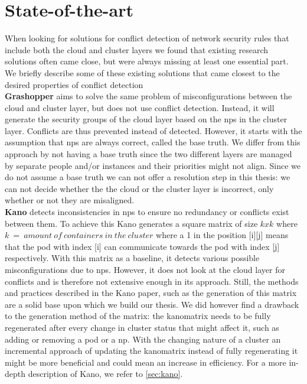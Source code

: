 \section{State-of-the-art} \label{sec:stateoftheart}
When looking for solutions for conflict detection of network security rules that include both the cloud and cluster layers we found that existing research solutions often came close, but were always missing at least one essential part. We briefly describe some of these existing solutions that came closest to the desired properties of conflict detection
\\[10pt]

\textbf{Grashopper} \cite{grashopper}  aims to solve the same problem of misconfigurations between the cloud and cluster layer, but does not use conflict detection. Instead, it will generate the security groups of the cloud layer based on the \acrshort{np}s in the cluster layer. Conflicts are thus prevented instead of detected. However, it starts with the assumption that \acrshort{np}s are always correct, called the base truth. We differ from this approach by not having a base truth since the two different layers are managed by separate people and/or instances and their priorities might not align. Since we do not assume a base truth we can not offer a resolution step in this thesis: we can not decide whether the the cloud or the cluster layer is incorrect, only whether or not they are misaligned.
\\[10pt]

\textbf{Kano} \cite{kano} detects inconsistencies in \acrshort{np}s to ensure no redundancy or conflicts exist between them. 
To achieve this Kano generates a square matrix of size \(kxk\) where \(k\ =\ amount\  of\  containers\  in\  the\  cluster\) where a 1 in the position [i][j] means that the pod with index [i] can communicate towards the pod with index [j] respectively. With this matrix as a baseline, it detects various possible misconfigurations due to \acrshort{np}s. However, it does not look at the cloud layer for conflicts and is therefore not extensive enough in its approach. Still, the methods and practices described in the Kano paper, such as the generation of this matrix are a solid base upon which we build our thesis. We did however find a drawback to the generation method of the matrix: the kanomatrix needs to be fully regenerated after every change in cluster status that might affect it, such as adding or removing a pod or a \acrshort{np}. With the changing nature of a cluster an incremental approach of updating the kanomatrix instead of fully regenerating it might be more beneficial and could mean an increase in efficiency. For a more in-depth description of Kano, we refer to \autoref{sec:kano}.
\\[10pt]


